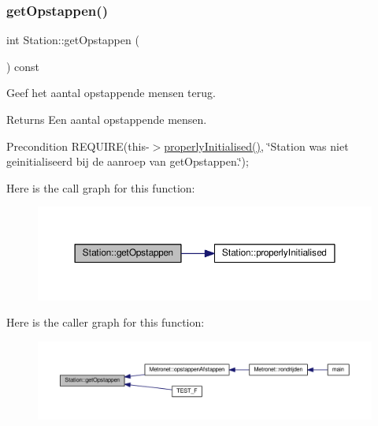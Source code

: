 \subsubsection{\texorpdfstring{get\+Opstappen()}{getOpstappen()}}
{\footnotesize\ttfamily int Station\+::get\+Opstappen (\begin{DoxyParamCaption}{ }\end{DoxyParamCaption}) const}



Geef het aantal opstappende mensen terug. 

\begin{DoxyReturn}{Returns}
Een aantal opstappende mensen. 
\end{DoxyReturn}
\begin{DoxyPrecond}{Precondition}
R\+E\+Q\+U\+I\+RE(this-\/$>$\hyperlink{class_station_a9ce626dd0599e3ea8107404a59c21e16}{properly\+Initialised()}, \char`\"{}\+Station was niet geinitialiseerd bij de aanroep van get\+Opstappen.\char`\"{}); 
\end{DoxyPrecond}
Here is the call graph for this function\+:\nopagebreak
\begin{figure}[H]
\begin{center}
\leavevmode
\includegraphics[width=350pt]{class_station_a5897f83319093d502f01f18b24678aba_cgraph}
\end{center}
\end{figure}
Here is the caller graph for this function\+:\nopagebreak
\begin{figure}[H]
\begin{center}
\leavevmode
\includegraphics[width=350pt]{class_station_a5897f83319093d502f01f18b24678aba_icgraph}
\end{center}
\end{figure}
\mbox{\label{class_station_a081ca6373631199a30ebab56f50022d8}} 
